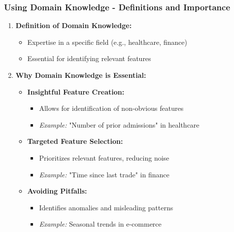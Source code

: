 \documentclass[aspectratio=169]{beamer}
\begin{document}
\begin{frame}[fragile]
    \frametitle{Using Domain Knowledge - Definitions and Importance}
    \begin{enumerate}
        \item \textbf{Definition of Domain Knowledge:}
            \begin{itemize}
                \item Expertise in a specific field (e.g., healthcare, finance)
                \item Essential for identifying relevant features
            \end{itemize}

        \item \textbf{Why Domain Knowledge is Essential:}
            \begin{itemize}
                \item \textbf{Insightful Feature Creation:} 
                    \begin{itemize}
                        \item Allows for identification of non-obvious features
                        \item \textit{Example:} "Number of prior admissions" in healthcare
                    \end{itemize}

                \item \textbf{Targeted Feature Selection:}
                    \begin{itemize}
                        \item Prioritizes relevant features, reducing noise
                        \item \textit{Example:} "Time since last trade" in finance
                    \end{itemize}

                \item \textbf{Avoiding Pitfalls:}
                    \begin{itemize}
                        \item Identifies anomalies and misleading patterns
                        \item \textit{Example:} Seasonal trends in e-commerce
                    \end{itemize}
            \end{itemize}
    \end{enumerate}
\end{frame}
\end{document}
